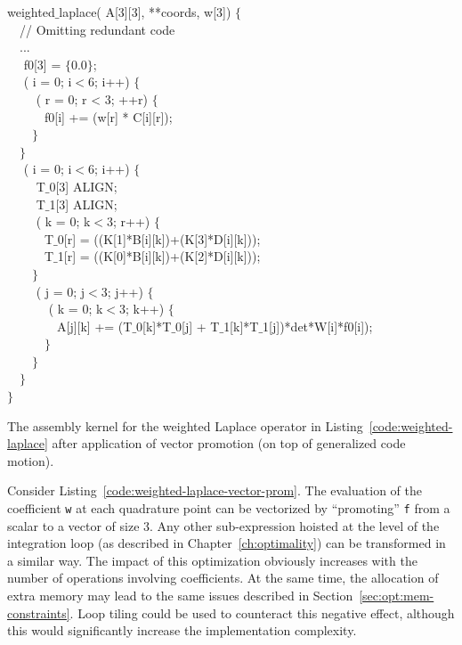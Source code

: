 \begin{algorithm}
\scriptsize\ttfamily
{}

 weighted$\_$laplace( A[3][3],  **coords,  w[3]) $\lbrace$\\
~~// Omitting redundant code \\
~~...\\
~~ f0[3] = $\lbrace$0.0$\rbrace$;\\
~~ ( i = 0; i$<$6; i++) $\lbrace$ \\
~~~~ ( r  = 0; r < 3; ++r) $\lbrace$ \\
~~~~~~f0[i] += (w[r] * C[i][r]);\\
~~~~$\rbrace$ \\
~~$\rbrace$\\
~~ ( i = 0; i$<$6; i++) $\lbrace$ \\
~~~~ T$\_$0[3] ALIGN;\\
~~~~ T$\_$1[3] ALIGN;\\
~~~~ ( k = 0; k$<$3; r++) $\lbrace$ \\
~~~~~~T$\_$0[r] = ((K[1]*B[i][k])+(K[3]*D[i][k]));\\
~~~~~~T$\_$1[r] = ((K[0]*B[i][k])+(K[2]*D[i][k]));\\
~~~~$\rbrace$\\
~~~~ ( j = 0; j$<$3; j++) $\lbrace$\\
~~~~~~ ( k = 0; k$<$3; k++) $\lbrace$\\
~~~~~~~~A[j][k] += (T$\_$0[k]*T$\_$0[j] + T$\_$1[k]*T$\_$1[j])*det*W[i]*f0[i]);\\
~~~~~~$\rbrace$\\
~~~~$\rbrace$\\
~~$\rbrace$\\
$\rbrace$

\caption{The assembly kernel for the weighted Laplace operator in Listing~\ref{code:weighted-laplace} after application of vector promotion (on top of generalized code motion).}
\label{code:weighted-laplace-vector-prom}
\end{algorithm}

Consider Listing~\ref{code:weighted-laplace-vector-prom}. The evaluation of the coefficient \texttt{w} at each quadrature point can be vectorized by ``promoting'' \texttt{f} from a scalar to a vector of size 3. Any other sub-expression hoisted at the level of the integration loop (as described in Chapter~\ref{ch:optimality}) can be transformed in a similar way. The impact of this optimization obviously increases with the number of operations involving coefficients. At the same time, the allocation of extra memory may lead to the same issues described in Section~\ref{sec:opt:mem-constraints}. Loop tiling could be used to counteract this negative effect, although this would significantly increase the implementation complexity.


